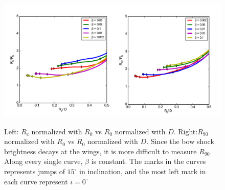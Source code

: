 \begin{figure}
\includegraphics[width=\linewidth]{radii-vs-r0}
\label{fig:radii-r0}
\caption{Left: $R_c$ normalized with $R_0$ vs $R_0$ normalized with $D$. Right:$R_{90}$ normalized with $R_0$ vs $R_0$ normalized with $D$. Since the bow shock brightness decays 
at the wings, it is more difficult to measure $R_{90}$. Along every single curve, $\beta$ is constant. The marks in the curves represents jumps of $15^\circ$ in inclination, and the most left 
mark in each curve represent $i=0^\circ$}
\end{figure}
